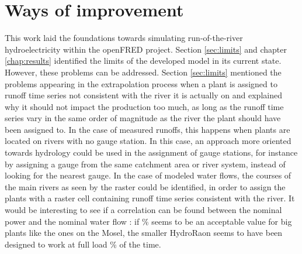 \section{Ways of improvement}
\label{sec:improv}

This work laid the foundations towards simulating run-of-the-river hydroelectricity within the openFRED project. Section \ref{sec:limits} and chapter \ref{chap:results} identified the limits of the developed model in its current state. However, these problems can be addressed.\newline
Section \ref{sec:limits} mentioned the problems appearing in the extrapolation process when a plant is assigned to runoff time series not consistent with the river it is actually on and explained why it should not impact the production too much, as long as the runoff time series vary in the same order of magnitude as the river the plant should have been assigned to. In the case of measured runoffs, this happens when plants are located on rivers with no gauge station. In this case, an approach more oriented towards hydrology could be used in the assignment of gauge stations, for instance by assigning a gauge from the same catchment area or river system, instead of looking for the nearest gauge. In the case of modeled water flows, the courses of the main rivers as seen by the raster could be identified, in order to assign the plants with a raster cell containing runoff time series consistent with the river. \newline
 It would be interesting to see if a correlation can be found between the nominal power and the nominal water flow : if \unit[20]{\%} seems to be an acceptable value for big plants like the ones on the Mosel, the smaller HydroRaon seems to have been designed to work at full load \unit[30]{\%} of the time.